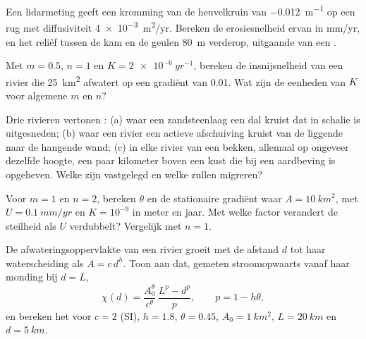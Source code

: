 \begin{exercise}[$\star$]\label{exo:b3:quantitative-geomorphology:2}
Een lidarmeting geeft een kromming van de heuvelkruin van \qty{-0.012}{m^{-1}} op een
rug met diffusiviteit \qty{4e-3}{m^2/yr}. Bereken de erosiesnelheid ervan in
\unit{mm/yr}, en het reliëf tussen de kam en de geulen
\qty{80}{m} verderop, uitgaande van een .
\end{exercise}

\begin{exercise}[$\star$]\label{exo:b3:quantitative-geomorphology:3}
Met $m = 0.5$, $n = 1$ en $K = \qty{2e-6}{yr^{-1}}$, bereken de
insnijsnelheid van een rivier die \qty{25}{km^2} afwatert op een gradiënt van 0.01.
Wat zijn de eenheden van $K$ voor algemene $m$ en $n$?
\end{exercise}

\begin{exercise}[$\star$]\label{exo:b3:quantitative-geomorphology:4}
Drie rivieren vertonen : (a) waar een zandsteenlaag een dal kruist dat
in schalie is uitgesneden; (b) waar een rivier een actieve afschuiving kruist van de
liggende naar de hangende wand; (c) in elke rivier van een bekken, allemaal op
ongeveer dezelfde hoogte, een paar kilometer boven een kust die bij een
aardbeving is opgeheven. Welke zijn vastgelegd en welke zullen migreren?
\end{exercise}

\begin{exercise}[$\star\star$]\label{exo:b3:quantitative-geomorphology:5}
Voor $m = 1$ en $n = 2$, bereken $\theta$ en de stationaire gradiënt waar $A =
\qty{10}{km^2}$, met $U = \qty{0.1}{mm/yr}$ en $K = 10^{-9}$ in meter en
jaar.
Met welke factor verandert de steilheid als $U$ verdubbelt? Vergelijk met $n =
1$.
\end{exercise}

\begin{exercise}[$\star\star$]\label{exo:b3:quantitative-geomorphology:6}
De afwateringsoppervlakte van een rivier groeit met de afstand $d$ tot haar waterscheiding als $A =
c\,d^{h}$. Toon aan dat, gemeten stroomopwaarts vanaf haar monding bij $d = L$,
\[
\chi(d) = \frac{A_0^{\theta}}{c^{\theta}}\,\frac{L^{p} - d^{p}}{p},
\qquad p = 1 - h\theta ,
\]
en bereken het voor $c = 2$ (SI), $h = 1.8$, $\theta = 0.45$, $A_0 =
\qty{1}{km^2}$, $L = \qty{20}{km}$ en $d = \qty{5}{km}$.
\end{exercise}

